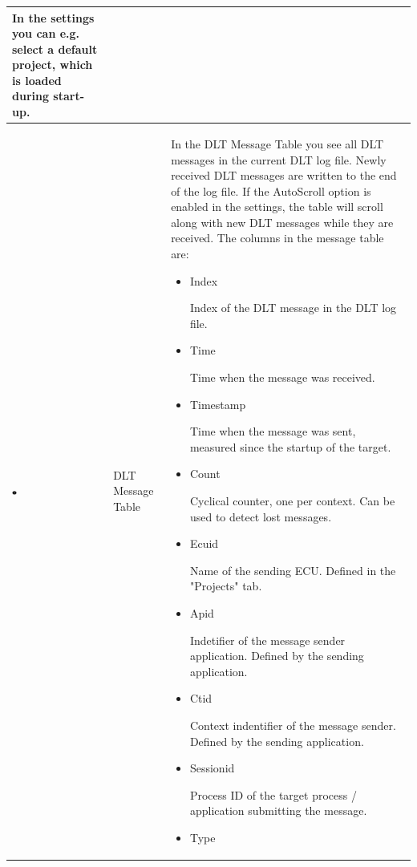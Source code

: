 \documentclass[a4paper,11pt]{article}
\begin{document}
\begin{longtable}{| l | m{3cm}  | m{11cm} |}
   In the settings you can e.g. select a default project, which is loaded during start-up.  \\
   \hline
   \includegraphics[width=0.05\textwidth]{images/Mark3.png}
   &
    DLT Message Table
   &
   In the DLT Message Table you see all DLT messages in the current DLT log file.
   Newly received DLT messages are written to the end of the log file.
   If the AutoScroll option is enabled in the settings, the table will scroll along with new DLT messages while they are received.
   The columns in the message table are:\label{messagetablecolumns}
  \begin{itemize}
   \item \begin{bf}Index\end{bf}
    Index of the DLT message in the DLT log file.
   \item \begin{bf}Time\end{bf}
    Time when the message was received.
   \item \begin{bf}Timestamp\end{bf}
     Time when the message was sent, measured since the startup of the target.
   \item \begin{bf}Count\end{bf}
    Cyclical counter, one per context. Can be used to detect lost messages.
   \item \begin{bf}Ecuid\end{bf}
    Name of the sending ECU. Defined in the "Projects" tab.
   \item \begin{bf}Apid\end{bf}
    Indetifier of the message sender application. Defined by the sending application.
   \item \begin{bf}Ctid\end{bf}
    Context indentifier of the message sender. Defined by the sending application.
   \item \begin{bf}Sessionid\end{bf}
    Process ID of the target process / application submitting the message.
   \item \begin{bf}Type\end{bf}

\end{itemize}
\end{longtable}
\end{document}
